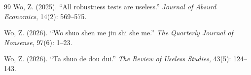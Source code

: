 \documentclass[AER]{AEA}
\begin{document}
\FloatBarrier

\begin{thebibliography}{99}
Wo, Z. (2025). ``All robustness tests are useless.'' \textit{Journal of Absurd Economics}, 14(2): 569--575.

Wo, Z. (2026). ``Wo shuo shen me jiu shi she me.'' \textit{The Quarterly Journal of Nonsense}, 97(6): 1--23.

Wo, Z. (2026). ``Ta shuo de dou dui.'' \textit{The Review of Useless Studies}, 43(5): 124--143.
\end{thebibliography}
\end{document}
